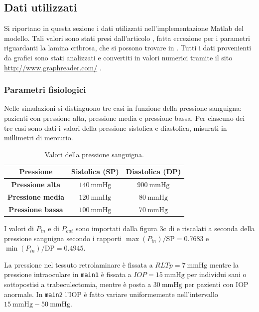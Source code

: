 \documentclass{article}
\begin{document}
\subsection{Dati utilizzati}
Si riportano in questa sezione i dati utilizzati nell'implementazione Matlab del modello.
Tali valori sono stati presi dall'articolo \citep{art1}, fatta eccezione per i parametri riguardanti la lamina cribrosa, che si possono trovare in \cite{art3}.
Tutti i dati provenienti da grafici sono stati analizzati e convertiti in valori numerici tramite il sito \url{http://www.graphreader.com/} \cite{ricalca}.

\subsubsection*{Parametri fisiologici}
Nelle simulazioni si distinguono tre casi in funzione della pressione sanguigna: pazienti con pressione alta, pressione media e pressione bassa.
Per ciascuno dei tre casi sono dati i valori della pressione sistolica e diastolica, misurati in millimetri di mercurio.
\begin{table}[h!]
\begin{center}
\begin{tabular}{| c | c | c |}
\hline
 \textbf{Pressione} & \textbf{Sistolica (SP)} & \textbf{Diastolica (DP)}\\
\hline
\textbf{Pressione alta} & $\SI{140}{\mmHg}$ & $\SI{900}{\mmHg}$\\
\textbf{Pressione media} & $\SI{120}{\mmHg}$ & $\SI{80}{\mmHg}$\\
\textbf{Pressione bassa} & $\SI{100}{\mmHg}$ & $\SI{70}{\mmHg}$\\
\hline
\end{tabular}
\caption{Valori della pressione sanguigna.}
\label{tab_pressione}
\end{center}
\end{table}

I valori di $P_{in}$ e di $P_{out}$ sono importati dalla figura 3c di \cite{art1} e riscalati a seconda della pressione sanguigna secondo i rapporti $\max(P_{in}) / \mbox{SP} = 0.7683$ e $\min(P_{in}) / \mbox{DP} = 0.4945$.

La pressione nel tessuto retrolaminare è fissata a $RLTp = \SI{7}{\mmHg}$ mentre la pressione intraoculare in \texttt{main1} è fissata a $IOP = \SI{15}{\mmHg}$ per individui sani o sottopostisi a trabeculectomia, mentre è posta a $\SI{30}{\mmHg}$ per pazienti con IOP anormale.
In \texttt{main2} l'IOP è fatto variare uniformemente nell'intervallo $\SI{15}{\mmHg} - \SI{50}{\mmHg}$.
\end{document}
